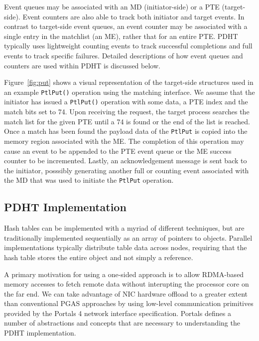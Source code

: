 Event queues may be associated with an MD (initiator-side) or a PTE
(target-side). Event counters are also able to track both initiator
and target events. In contrast to target-side event queues, an event
counter may be associated with a single entry in the matchlist (an ME), 
rather that for an entire PTE. PDHT typically uses lightweight counting
events to track successful completions and full events to track specific
failures. Detailed descriptions of how event queues and counters are used
within PDHT is discussed below.

Figure~\ref{fig:put} shows a visual representation of the target-side
structures used in an example {\tt PtlPut()} operation using the matching
interface. We assume that the initiator has issued a {\tt PtlPut()} operation
with some data, a PTE index and the match bits set to 74. Upon receiving the
request, the target process searches the match list for the given PTE until a
74 is found or the end of the list is reached. Once a match has been found the
payload data of the {\tt PtlPut} is copied into the memory region associated
with the ME. The completion of this operation may cause an event to be appended
to the PTE event queue or the ME success counter to be incremented. 
Lastly, an acknowledgement message is sent back to the initiator, posssibly
generating another full or counting event associated with the MD that
was used to initiate the {\tt PtlPut} operation.



\subsection{PDHT Implementation}

Hash tables can be implemented with a myriad of different techniques, but are
traditionally implemented sequentially as an array of pointers to objects.
Parallel implementations typically distribute table data across nodes,
requiring that the hash table stores the entire object and not simply a
reference. 


A primary motivation for using a one-sided approach is to allow
RDMA-based memory accesses to fetch remote data without interupting
the processor core on the far end. We can take advantage of NIC
hardware offload to a greater extent than conventional PGAS approaches
by using low-level communication primitives provided by the Portals 4
network interface specification. Portals defines a number of
abstractions and concepts that are necessary to understanding the PDHT
implementation.


